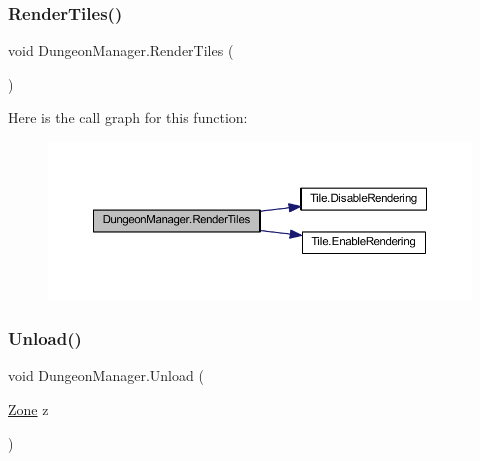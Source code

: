 \mbox{\label{class_dungeon_manager_a89bde2dbae3ffb1dd89635df4a8df153}} 
\subsubsection{\texorpdfstring{RenderTiles()}{RenderTiles()}}
{\footnotesize\ttfamily void Dungeon\+Manager.\+Render\+Tiles (\begin{DoxyParamCaption}{ }\end{DoxyParamCaption})}

Here is the call graph for this function\+:
\nopagebreak
\begin{figure}[H]
\begin{center}
\leavevmode
\includegraphics[width=350pt]{class_dungeon_manager_a89bde2dbae3ffb1dd89635df4a8df153_cgraph}
\end{center}
\end{figure}
\mbox{\label{class_dungeon_manager_a010c39db85d745cd24e4e960d248ab4a}} 
\subsubsection{\texorpdfstring{Unload()}{Unload()}}
{\footnotesize\ttfamily void Dungeon\+Manager.\+Unload (\begin{DoxyParamCaption}\item[{\mbox{\hyperlink{class_dungeon_manager_a6558d4a01889674bf25c798f1b90a431}{Zone}}}]{z }\end{DoxyParamCaption})}

\mbox{\label{class_dungeon_manager_a980762c66ae4ae92ce3d8caa42f7fe61}} 
